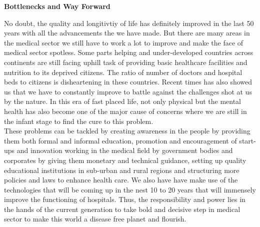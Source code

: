 \documentclass[a4paper,14pt]{extarticle}
\begin{document}
\begin{Large}
\textbf{Bottlenecks and Way Forward}\\
\end{Large}

No doubt, the quality and longitivtiy of life has definitely improved in the last 50 years with all the advancements the we have made. But there are many areas in the medical sector we still have to work a lot to improve and make the face of medical sector spotless. Some parts helping and under-developed countries across continents are still facing uphill task of providing basic healthcare facilities and nutrition to its deprived citizens. The ratio of number of doctors and hospital beds to citizens is disheartening in these countries. Recent times has also showed us that we have to constantly improve to battle against the challenges shot at us by the nature. In this era of fast placed life, not only physical but the mental health has also become one of the major cause of concerns where we are still in the infant stage to find the cure to this problem.\\

These problems can be tackled by creating awareness in the people by providing them both formal and informal education, promotion and encouragement of start-ups and innovation working in the medical field by government bodies and corporates by giving them monetary and technical guidance, setting up quality educational institutions in sub-urban and rural regions and structuring more policies and laws to enhance health care. We also have have make use of the technologies that will be coming up in the nest 10 to 20 years that will immensely improve the functioning of hospitals. Thus, the responsibility and power lies in the hands of the current generation to take bold and decisive step in medical sector to make this world a disease free planet and flourish.
\end{document}
